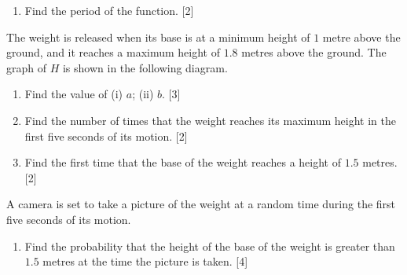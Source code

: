 \documentclass[12pt, twoside]{article}
\begin{document}
\begin{enumerate}
\begin{enumerate}[itemsep=0.05cm]
  \item Find the period of the function. \hfill [2]
\end{enumerate}

The weight is released when its base is at a minimum height of $1$ metre above the ground, and it reaches a maximum height of $1.8$ metres above the ground. The graph of $H$ is shown in the following diagram.


\begin{center}
\end{center}

\begin{enumerate}[itemsep=0.1cm]
  \item[(b)] Find the value of (i) $a$; (ii) $b$. \hfill [3]
  \item[(c)] Find the number of times that the weight reaches its maximum height in the first five seconds of its motion. \hfill [2]
  \item[(d)] Find the first time that the base of the weight reaches a height of $1.5$ metres. \hfill [2]
\end{enumerate}

A camera is set to take a picture of the weight at a random time during the first five seconds of its motion.

\begin{enumerate}[itemsep=0.1cm]
  \item[(e)] Find the probability that the height of the base of the weight is greater than $1.5$ metres at the time the picture is taken. \hfill [4]
\end{enumerate}


\end{enumerate}
\end{document}
